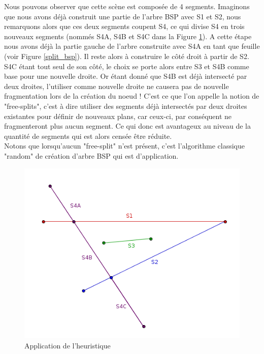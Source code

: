 \documentclass[11pt,a4paper]{article}
\theoremstyle{definition}
\theoremstyle{remark}
\begin{document}
Nous pouvons observer que cette scène est composée de 4 segments. Imaginons que nous avons déjà construit une partie de l'arbre BSP avec S1 et S2, nous remarquons alors que ces deux segments coupent S4, ce qui divise S4 en trois nouveaux segments (nommés S4A, S4B et S4C dans la Figure \ref{heuristic_splits}). A cette étape nous avons déjà la partie gauche de l'arbre construite avec S4A en tant que feuille (voir Figure \ref{split_bsp}). Il reste alors à construire le côté droit à partir de S2. S4C étant tout seul de son côté, le choix se porte alors entre S3 et S4B comme base pour une nouvelle droite. Or étant donné que S4B est déjà intersecté par deux droites, l'utiliser comme nouvelle droite ne causera pas de nouvelle fragmentation lors de la création du noeud ! C'est ce que l'on appelle la notion de "free-splits", c'est à dire utiliser des segments déjà intersectés par deux droites existantes pour définir de nouveaux plans, car ceux-ci, par conséquent ne fragmenteront plus aucun segment. Ce qui donc est avantageux au niveau de la quantité de segments qui est alors censée être réduite.\\

Notons que lorsqu'aucun "free-split" n'est présent, c'est l'algorithme classique "random" de création d'arbre BSP qui est d'application. 

\begin{figure}[!h]
\centering
\includegraphics[scale=0.5]{free_splits_1.png}
\caption{Application de l'heuristique}
\label{heuristic_splits}
\end{figure}
\end{document}
